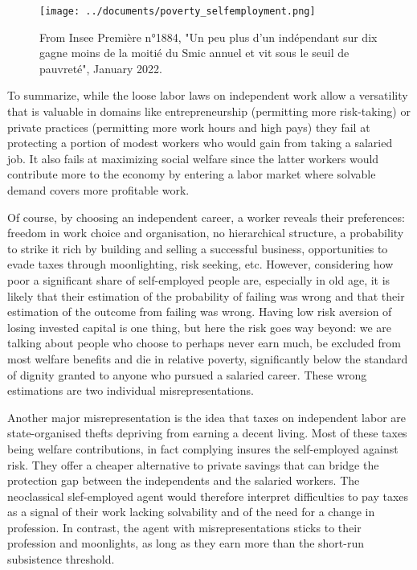 \documentclass{article}
\begin{document}
\begin{figure}[H]
    \centering
    \texttt{[image: ../documents/poverty\_selfemployment.png]}
    \caption{From Insee Première n°1884, "Un peu plus d’un indépendant sur dix gagne moins de la moitié du Smic annuel et vit sous le seuil de pauvreté", January 2022.}
    \label{fig:enter-label}
\end{figure}

To summarize, while the loose labor laws on independent work allow a versatility that is valuable in domains like entrepreneurship (permitting more risk-taking) or private practices (permitting more work hours and high pays) they fail at protecting a portion of modest workers who would gain from taking a salaried job. It also fails at maximizing social welfare since the latter workers would contribute more to the economy by entering a labor market where solvable demand covers more profitable work.

Of course, by choosing an independent career, a worker reveals their preferences: freedom in work choice and organisation, no hierarchical structure, a probability to strike it rich by building and selling a successful business, opportunities to evade taxes through moonlighting, risk seeking, etc. However, considering how poor a significant share of self-employed people are, especially in old age, it is likely that their estimation of the probability of failing was wrong and that their estimation of the outcome from failing was wrong. Having low risk aversion of losing invested capital is one thing, but here the risk goes way beyond: we are talking about people who choose to perhaps never earn much, be excluded from most welfare benefits and die in relative poverty, significantly below the standard of dignity granted to anyone who pursued a salaried career. These wrong estimations are two individual misrepresentations.

Another major misrepresentation is the idea that taxes on independent labor are state-organised thefts depriving from earning a decent living. Most of these taxes being welfare contributions, in fact complying insures the self-employed against risk. They offer a cheaper alternative to private savings that can bridge the protection gap between the independents and the salaried workers. The neoclassical slef-employed agent would therefore interpret difficulties to pay taxes as a signal of their work lacking solvability and of the need for a change in profession. In contrast, the agent with misrepresentations sticks to their profession and moonlights, as long as they earn more than the short-run subsistence threshold.
\end{document}
